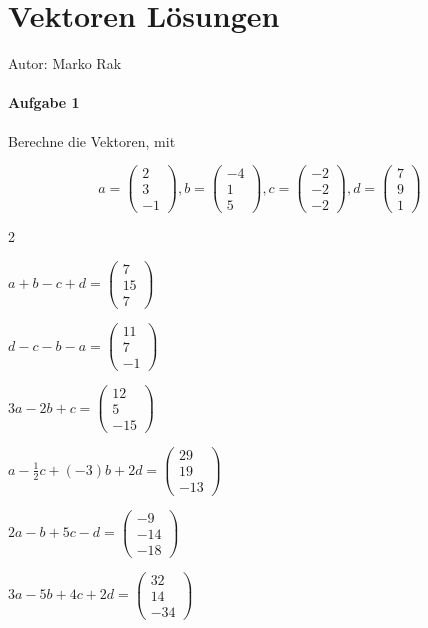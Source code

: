 \def\vect#1,#2{\left(\!\!\!\begin{array}{c}#1\\#2\end{array}\!\!\!\right)}
\newcommand{\mvect}[1]{\left(\!\!\!\begin{array}{c}#1%
\end{array}\!\!\!\right)}

\chapter{Vektoren L\"osungen}

	Autor: Marko Rak
	
	\subsubsection{Aufgabe 1}
		
		Berechne die Vektoren, mit
		
		\[
			a = \mvect{2\\3\\-1},
			b= \mvect{-4\\1\\5},
			c = \mvect{-2\\-2\\-2},
			d = \mvect{7\\9\\1}
		\]
		
			\begin{enumerate}
			\end{enumerate}
		
